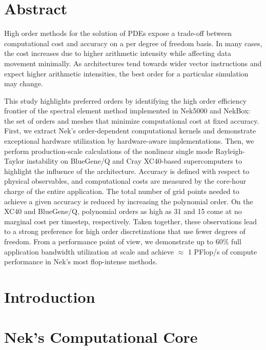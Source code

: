 

\section{Abstract}
High order methods for the solution of PDEs expose a trade-off between computational cost and accuracy on a per degree of freedom basis.
In many cases, the cost increases due to higher arithmetic intensity while affecting data movement minimally.
As architectures tend towards wider vector instructions and expect higher arithmetic intensities, the best order for a particular simulation may change.

This study highlights preferred orders by identifying the high order efficiency frontier of the spectral element method implemented in Nek5000 and NekBox: the set of orders and meshes that minimize computational cost at fixed accuracy.
First, we extract Nek's order-dependent computational kernels and demonstrate exceptional hardware utilization by hardware-aware implementations.
Then, we perform production-scale calculations of the nonlinear single mode Rayleigh-Taylor instability on BlueGene/Q and Cray XC40-based supercomputers to highlight the influence of the architecture.
Accuracy is defined with respect to physical observables, and computational costs are measured by the core-hour charge of the entire application.
The total number of grid points needed to achieve a given accuracy is reduced by increasing the polynomial order.
On the XC40 and BlueGene/Q, polynomial orders as high as 31 and 15 come at no marginal cost per timestep, respectively.
Taken together, these observations lead to a strong preference for high order discretizations that use fewer degrees of freedom.
From a performance point of view, we demonstrate up to 60\% full application bandwidth utilization at scale and achieve $\approx$ 1 PFlop/s of compute performance in Nek's most flop-intense methods.

\section{Introduction}
\label{sec:introduction}


\section{Nek's Computational Core}
\label{sec:math}


